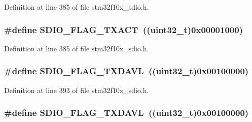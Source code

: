 Definition at line 385 of file stm32f10x\+\_\+sdio.\+h.

\subsubsection[{\texorpdfstring{S\+D\+I\+O\+\_\+\+F\+L\+A\+G\+\_\+\+T\+X\+A\+CT}{SDIO_FLAG_TXACT}}]{\setlength{\rightskip}{0pt plus 5cm}\#define S\+D\+I\+O\+\_\+\+F\+L\+A\+G\+\_\+\+T\+X\+A\+CT~(({\bf uint32\+\_\+t})0x00001000)}\hypertarget{group___s_d_i_o___flags_gad5d075c98012586b169ec131aab2eeb5}{}\label{group___s_d_i_o___flags_gad5d075c98012586b169ec131aab2eeb5}


Definition at line 385 of file stm32f10x\+\_\+sdio.\+h.

\subsubsection[{\texorpdfstring{S\+D\+I\+O\+\_\+\+F\+L\+A\+G\+\_\+\+T\+X\+D\+A\+VL}{SDIO_FLAG_TXDAVL}}]{\setlength{\rightskip}{0pt plus 5cm}\#define S\+D\+I\+O\+\_\+\+F\+L\+A\+G\+\_\+\+T\+X\+D\+A\+VL~(({\bf uint32\+\_\+t})0x00100000)}\hypertarget{group___s_d_i_o___flags_ga9c6620d6b16b6af19d3e14f40e688631}{}\label{group___s_d_i_o___flags_ga9c6620d6b16b6af19d3e14f40e688631}


Definition at line 393 of file stm32f10x\+\_\+sdio.\+h.

\subsubsection[{\texorpdfstring{S\+D\+I\+O\+\_\+\+F\+L\+A\+G\+\_\+\+T\+X\+D\+A\+VL}{SDIO_FLAG_TXDAVL}}]{\setlength{\rightskip}{0pt plus 5cm}\#define S\+D\+I\+O\+\_\+\+F\+L\+A\+G\+\_\+\+T\+X\+D\+A\+VL~(({\bf uint32\+\_\+t})0x00100000)}\hypertarget{group___s_d_i_o___flags_ga9c6620d6b16b6af19d3e14f40e688631}{}\label{group___s_d_i_o___flags_ga9c6620d6b16b6af19d3e14f40e688631}


